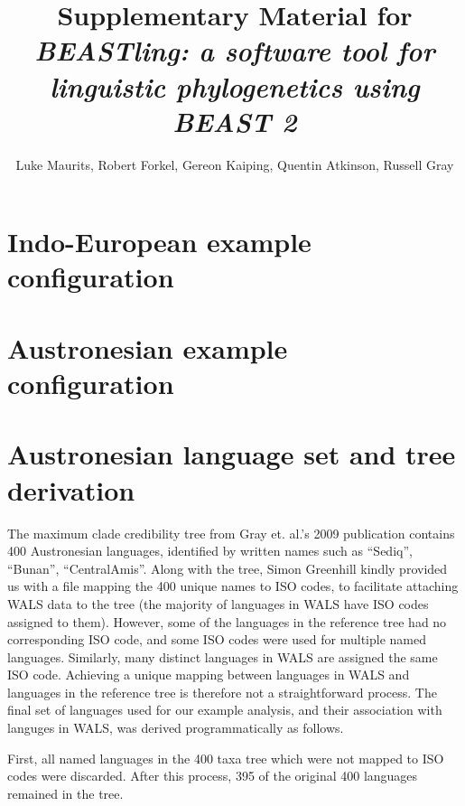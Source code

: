 \documentclass[10pt,a4paper]{article}
\begin{document}
\title{Supplementary Material for \emph{BEASTling: a software tool for linguistic phylogenetics using BEAST 2}}
\author{Luke Maurits, Robert Forkel, Gereon Kaiping, Quentin Atkinson, Russell Gray}
\maketitle

\section{Indo-European example configuration}

\begin{alltt}

\end{alltt}

\section{Austronesian example configuration}

\begin{alltt}

\end{alltt}

\section{Austronesian language set and tree derivation}

The maximum clade credibility tree from Gray et. al.'s 2009 publication contains 400 Austronesian languages, identified by written names such as ``Sediq'', ``Bunan'', ``CentralAmis''.  Along with the tree, Simon Greenhill kindly provided us with a file mapping the 400 unique names to ISO codes, to facilitate attaching WALS data to the tree (the majority of languages in WALS have ISO codes assigned to them).  However, some of the languages in the reference tree had no corresponding ISO code, and some ISO codes were used for multiple named languages.  Similarly, many distinct languages in WALS are assigned the same ISO code.  Achieving a unique mapping between languages in WALS and languages in the reference tree is therefore not a straightforward process.  The final set of languages used for our example analysis, and their association with languges in WALS, was derived programmatically as follows.

First, all named languages in the 400 taxa tree which were not mapped to ISO codes were discarded.  After this process, 395 of the original 400 languages remained in the tree.
\end{document}
